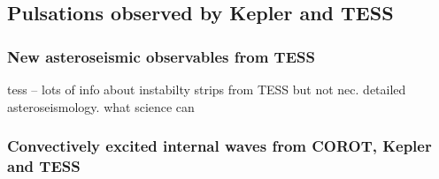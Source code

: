 {\color{blue}
\subsection{Pulsations observed by Kepler and TESS}



\subsubsection{New asteroseismic observables from TESS}

tess -- lots of info about instabilty strips from TESS but not nec. detailed asteroseismology.  what science can 

\subsubsection{Convectively excited internal waves from COROT, Kepler and TESS}


}